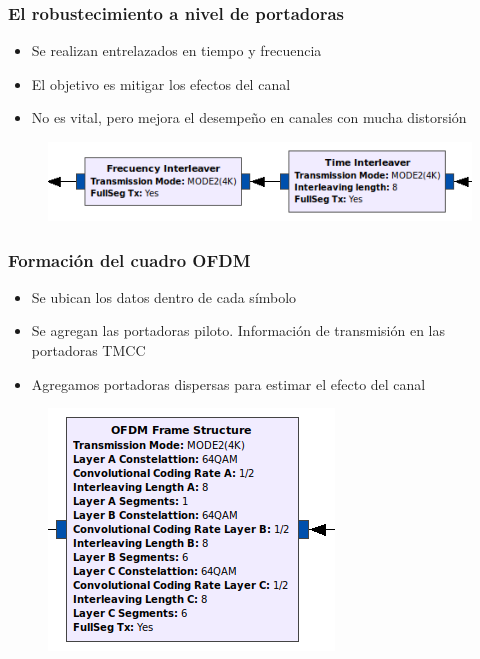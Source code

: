\begin{frame}
\frametitle{El robustecimiento a nivel de portadoras}
\begin{itemize}	
	\item { Se realizan entrelazados en tiempo y frecuencia}
	\item {	El objetivo es mitigar los efectos del canal}
	\item { No es vital, pero mejora el desempeño en canales con mucha distorsión }
\end{itemize}
\begin{figure}
	\includegraphics[scale=0.55]{rob_port}
\end{figure}
\end{frame}
\begin{frame}
\frametitle{Formación del cuadro OFDM}
\begin{itemize}	
	\item { Se ubican los datos dentro de cada símbolo}
	\item {	Se agregan las portadoras piloto. Información de transmisión en las portadoras TMCC}
	\item { Agregamos portadoras dispersas para estimar el efecto del canal }
\end{itemize}
\begin{figure}
	\includegraphics[scale=0.4]{bloque_ofdm}
\end{figure}
\end{frame}

